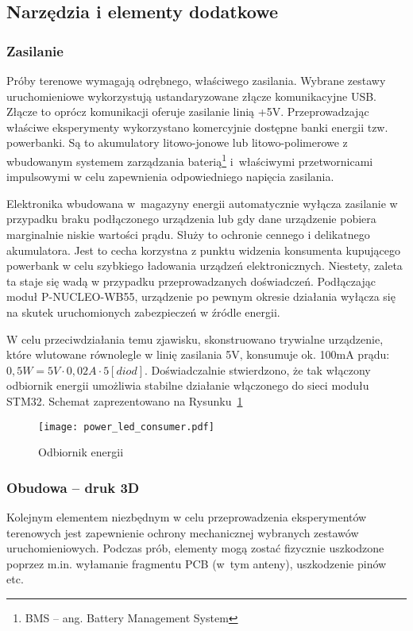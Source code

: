 \subsection{Narzędzia i elementy dodatkowe}

\subsubsection{Zasilanie}
Próby terenowe wymagają odrębnego, właściwego zasilania. Wybrane zestawy uruchomieniowe
wykorzystują ustandaryzowane złącze komunikacyjne USB. Złącze to oprócz komunikacji
oferuje zasilanie linią +5V. Przeprowadzając właściwe eksperymenty wykorzystano
komercyjnie dostępne banki energii tzw. powerbanki. Są to akumulatory litowo-jonowe
lub litowo-polimerowe z wbudowanym systemem zarządzania baterią\footnote{\gls{BMS} -- ang. Battery Management System}
i~właściwymi przetwornicami impulsowymi w celu zapewnienia odpowiedniego napięcia zasilania.

Elektronika wbudowana w~magazyny energii automatycznie wyłącza zasilanie w przypadku braku
podłączonego urządzenia lub gdy dane urządzenie pobiera marginalnie niskie wartości
prądu. Służy to ochronie cennego i delikatnego akumulatora. Jest to cecha korzystna
z punktu widzenia konsumenta kupującego powerbank w celu szybkiego ładowania urządzeń elektronicznych.
Niestety, zaleta ta staje się wadą w przypadku przeprowadzanych doświadczeń. Podłączając moduł P-NUCLEO-WB55,
urządzenie po pewnym okresie działania wyłącza się na skutek uruchomionych zabezpieczeń w źródle energii.

W celu przeciwdziałania temu zjawisku, skonstruowano trywialne urządzenie, które wlutowane równolegle w linię zasilania 5V,
konsumuje ok. 100mA prądu: $0,5W = 5V \cdot 0,02A \cdot 5 [diod]$. Doświadczalnie stwierdzono, że tak włączony
odbiornik energii umożliwia stabilne działanie włączonego do sieci modułu STM32. Schemat 
zaprezentowano na Rysunku~\ref{rys:power_led_consumer}

\begin{figure}[!ht]
	\centering \texttt{[image: power\_led\_consumer.pdf]}
	\caption{Odbiornik energii}
	\label{rys:power_led_consumer}
\end{figure}

\subsubsection{Obudowa -- druk 3D}
Kolejnym elementem niezbędnym w celu przeprowadzenia eksperymentów terenowych jest zapewnienie
ochrony mechanicznej wybranych zestawów uruchomieniowych. Podczas prób, elementy mogą zostać
fizycznie uszkodzone poprzez m.in. wyłamanie fragmentu \gls{PCB} (w~tym anteny), uszkodzenie pinów etc.

